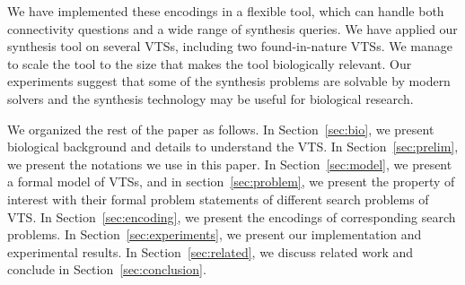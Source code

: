 %

%
%


\par We have implemented these encodings in a flexible tool, which can handle both connectivity questions and a wide range of synthesis queries. 
%
We have applied our synthesis tool on several VTSs, including
two found-in-nature VTSs.
%
We manage to scale the tool to the size that makes the tool biologically relevant. 
%
Our experiments suggest that some of the synthesis problems are solvable by modern solvers and the synthesis technology may be useful for biological research.
%

%
We organized the rest of the paper as follows. 
%
In Section~\ref{sec:bio}, we present biological background and details to understand the VTS. 
%
In Section~\ref{sec:prelim}, we present the notations we use in this paper. 
%
In Section~\ref{sec:model}, we present a formal model of VTSs, and in section~\ref{sec:problem}, we present the property of interest with their formal problem statements of different search problems of VTS.
%
In Section~\ref{sec:encoding}, we present the encodings of corresponding search problems. 
%
In Section~\ref{sec:experiments}, we present our implementation and experimental results. 
%
In Section~\ref{sec:related}, we discuss related work and conclude in Section~\ref{sec:conclusion}.
%
